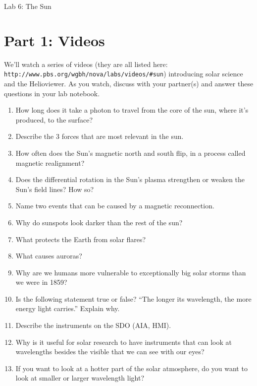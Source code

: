 \documentclass[11pt]{article}%
\begin{document}
\begin{center}
\huge Lab 6: The Sun
\end{center}
	

\section*{Part 1: Videos}
We'll watch a series of videos (they are all listed here: {\tt http://www.pbs.org/wgbh/nova/labs/videos/\#sun}) introducing solar science and the Helioviewer. As you watch, discuss with your partner(s) and answer these questions in your lab notebook. 
\begin{enumerate}
\item How long does it take a photon to travel from the core of the sun, where it's produced, to the surface?
\item Describe the 3 forces that are most relevant in the sun.
\item How often does the Sun's magnetic north and south flip, in a process called magnetic realignment?
\item Does the differential rotation in the Sun's plasma strengthen or weaken the Sun's field lines? How so?
\item Name two events that can be caused by a magnetic reconnection.
\item Why do sunspots look darker than the rest of the sun?
\item What protects the Earth from solar flares?
\item What causes auroras?
\item Why are we humans more vulnerable to exceptionally big solar storms than we were in 1859?
\item Is the following statement true or false? ``The longer its wavelength, the more energy light carries.'' Explain why.
\item Describe the instruments on the SDO (AIA, HMI).
\item Why is it useful for solar research to have instruments that can look at wavelengths besides the visible that we can see with our eyes?
\item If you want to look at a hotter part of the solar atmosphere, do you want to look at smaller or larger wavelength light?
\end{enumerate}
\end{document}
